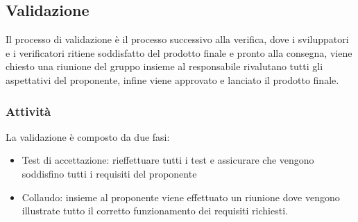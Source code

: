 \subsection{Validazione}
Il processo di validazione è il processo successivo alla verifica, dove i sviluppatori e i verificatori ritiene soddisfatto del prodotto finale e pronto alla consegna, viene chiesto una riunione del gruppo insieme al responsabile rivalutano tutti gli aspettativi del proponente, infine viene approvato e lanciato il prodotto finale.
\subsubsection{Attività}
La validazione è composto da due fasi:
\begin{itemize}
\item Test di accettazione: rieffettuare tutti i test e assicurare che vengono soddisfino tutti i requisiti del proponente
\item Collaudo: insieme al proponente viene effettuato un riunione dove vengono illustrate tutto il corretto funzionamento dei requisiti richiesti. 
\end{itemize}
